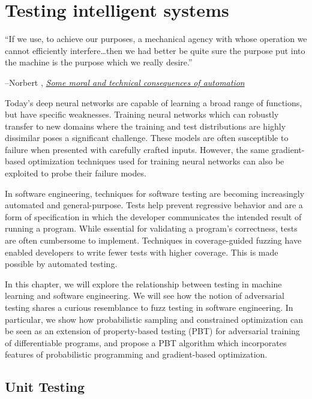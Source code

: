 
\chapter{Testing intelligent systems}\label{ch:difftest}

\setlength{\epigraphwidth}{0.80\textwidth}
\epigraph{``If we use, to achieve our purposes, a mechanical agency with whose operation we cannot efficiently interfere\ldots then we had better be quite sure the purpose put into the machine is the purpose which we really desire.''}{\begin{flushright}--Norbert \citet{wiener1960some}, \href{https://www.ias.ac.in/article/fulltext/reso/004/01/0080-0088}{\textit{Some moral and technical consequences of automation}}~\end{flushright}}

Today's deep neural networks are capable of learning a broad range of functions, but have specific weaknesses. Training neural networks which can robustly transfer to new domains where the training and test distributions are highly dissimilar poses a significant challenge. These models are often susceptible to failure when presented with carefully crafted inputs. However, the same gradient-based optimization techniques used for training neural networks can also be exploited to probe their failure modes.

In software engineering, techniques for software testing are becoming increasingly automated and general-purpose. Tests help prevent regressive behavior and are a form of specification in which the developer communicates the intended result of running a program. While essential for validating a program's correctness, tests are often cumbersome to implement. Techniques in coverage-guided fuzzing have enabled developers to write fewer tests with higher coverage. This is made possible by automated testing.

In this chapter, we will explore the relationship between testing in machine learning and software engineering. We will see how the notion of adversarial testing shares a curious resemblance to fuzz testing in software engineering. In particular, we show how probabilistic sampling and constrained optimization can be seen as an extension of property-based testing (PBT) for adversarial training of differentiable programs, and propose a PBT algorithm which incorporates features of probabilistic programming and gradient-based optimization.

\section{Unit Testing}

